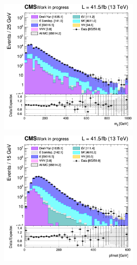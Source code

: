 \documentclass[a4paper, 10pt, openright]{report}
\begin{document}
\begin{figure}[htbp]
{\begin{minipage}[b]{.48\textwidth}
\includegraphics[width=7cm, height=7cm]{figs/2017/log_cratio_ttbarCR_ll_mll.png}
\end{minipage}\hfill
\begin{minipage}[b]{.48\textwidth}
\includegraphics[width=7cm, height=7cm]{figs/2017/log_cratio_ttbarCR_ll_METcorrected_pt.png}
\end{minipage} \hfill
}
\end{figure}
\end{document}
